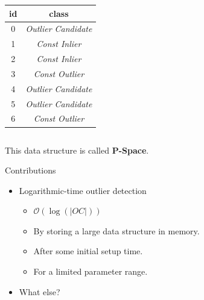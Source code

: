 \documentclass{beamer}
\begin{document}
\begin{frame}
{\begin{columns}
\begin{column}{.5\textwidth}
\begin{tabular}{|c|c|}
                    id & class \\
                    \hline
                    0 & \textit{Outlier Candidate} \\
                    1 & \textit{Const Inlier} \\
                    2 & \textit{Const Inlier} \\
                    3 & \textit{Const Outlier} \\
                    4 & \textit{Outlier Candidate} \\
                    5 & \textit{Outlier Candidate} \\
                    6 & \textit{Const Outlier} \\
                    \hline
                \end{tabular}
            \end{column}
        \end{columns}

        \vspace{1cm}
        This data structure is called \textbf{P-Space}.
    }
    \end{frame}
    \begin{frame}{Contributions}
        \begin{itemize}
            \item Logarithmic-time outlier detection 
                \begin{itemize}
                   \item $\mathcal{O}(\log(|OC|))$
                    \item By storing a large data structure in memory.
                    \item After some initial setup time.
                    \item For a limited parameter range.
                \end{itemize}
            \item What else?
        \end{itemize}
    \end{frame}
\end{document}
